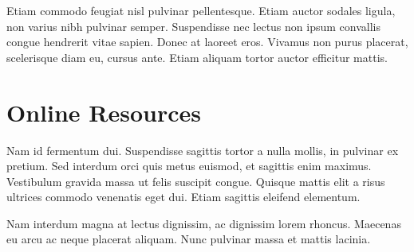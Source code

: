 \documentclass[sigconf]{acmart}
\begin{document}
Etiam commodo feugiat nisl pulvinar pellentesque. Etiam auctor sodales ligula, non varius nibh pulvinar semper. Suspendisse nec lectus non ipsum convallis congue hendrerit vitae sapien. Donec at laoreet eros. Vivamus non purus placerat, scelerisque diam eu, cursus ante. Etiam aliquam tortor auctor efficitur mattis. 

\section{Online Resources}

Nam id fermentum dui. Suspendisse sagittis tortor a nulla mollis, in pulvinar ex pretium. Sed interdum orci quis metus euismod, et sagittis enim maximus. Vestibulum gravida massa ut felis suscipit congue. Quisque mattis elit a risus ultrices commodo venenatis eget dui. Etiam sagittis eleifend elementum. 

Nam interdum magna at lectus dignissim, ac dignissim lorem rhoncus. Maecenas eu arcu ac neque placerat aliquam. Nunc pulvinar massa et mattis lacinia.
\end{document}

